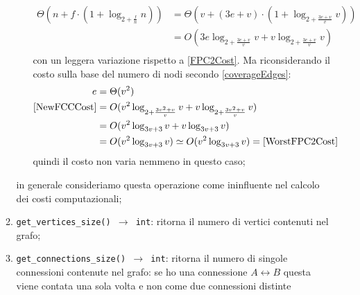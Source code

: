 \begin{enumerate}
\begin{enumerate}[resume]
\begin{itemize}
\begin{equation}
\begin{aligned}
                                                \Theta(n+f\cdot (1+\log_{2+\frac{f}{n}}n)) & = \Theta(v + (3e+v) \cdot ( 1+\log_{2+\frac{3e+v}{v}}v))    \\
                                                                                           & = O(3e\log_{2+\frac{3e+v}{v}}v + v\log_{2+\frac{3e+v}{v}}v) \\
                                          \end{aligned}
                                    \end{equation}
                                    con un leggera variazione rispetto a \eqref{FPC2Cost}. Ma riconsiderando il costo sulla base del numero di nodi
                                    secondo \eqref{coverageEdges}:
                                    \begin{equation}
                                          \begin{aligned}
                                                e                  & = \Theta(v^2)                                                          \\
                                                \eqref{NewFCCCost} & = O(v^2\log_{2+\frac{3v^2+v}{v}}v+ v\log_{2+\frac{3v^2+v}{v}}v)        \\
                                                                   & = O(v^2\log_{3v+3}v+ v\log_{3v+3}v)                                    \\
                                                                   & = O(v^2\log_{3v+3}v) \simeq O(v^2\log_{3v+3}v) = \eqref{WorstFPC2Cost}
                                          \end{aligned}
                                    \end{equation}
                                    quindi il costo non varia nemmeno in questo caso;
                        \end{itemize}
                        in generale consideriamo questa operazione come ininfluente nel calcolo dei costi computazionali;
                  \item \texttt{get\_vertices\_size() $\rightarrow$ int}: ritorna il numero di vertici contenuti nel grafo;
                  \item \texttt{get\_connections\_size() $\rightarrow$ int}: ritorna il numero di singole connessioni contenute nel grafo:
                        se ho una connessione $A \leftrightarrow B$ questa viene contata una sola volta e non come due connessioni distinte

\end{enumerate}
\end{enumerate}
